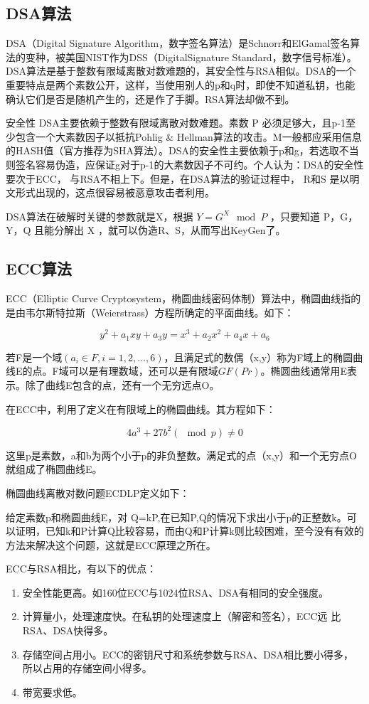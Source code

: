 \documentclass[UTF8,a4paper,10pt, twocolumn]{ctexart}
\begin{document}
\subsection{DSA算法}
DSA（Digital Signature Algorithm，数字签名算法）是Schnorr和ElGamal签名算法的变种，被美国NIST作为DSS（DigitalSignature Standard，数字信号标准）。DSA算法是基于整数有限域离散对数难题的，其安全性与RSA相似。DSA的一个重要特点是两个素数公开，这样，当使用别人的p和q时，即使不知道私钥，也能确认它们是否是随机产生的，还是作了手脚。RSA算法却做不到。

安全性 
DSA主要依赖于整数有限域离散对数难题。素数 P 必须足够大，且p-1至少包含一个大素数因子以抵抗Pohlig \& Hellman算法的攻击。M一般都应采用信息的HASH值（官方推荐为SHA算法）。DSA的安全性主要依赖于p和g，若选取不当则签名容易伪造，应保证g对于p-1的大素数因子不可约。个人认为：DSA的安全性要次于ECC， 与RSA不相上下。但是，在DSA算法的验证过程中， R和S 是以明文形式出现的，这点很容易被恶意攻击者利用。

DSA算法在破解时关键的参数就是X，根据 $Y = G^X \mod P$ ，只要知道 P，G，Y，Q 且能分解出 X ，就可以伪造R、S，从而写出KeyGen了。

\subsection{ECC算法}

ECC（Elliptic Curve Cryptosystem，椭圆曲线密码体制）算法中，椭圆曲线指的是由韦尔斯特拉斯（Weierstrass）方程所确定的平面曲线。如下：

$$ y^2 + a_1 xy + a_3 y = x^3 + a_2 x^2 + a_4 x + a_6 $$

若F是一个域$(a_i \in F,i=1,2,…,6)$，且满足式的数偶（x,y）称为F域上的椭圆曲线E的点。F域可以是有理数域，还可以是有限域$GF(Pr)$。椭圆曲线通常用E表示。除了曲线E包含的点，还有一个无穷远点O。

在ECC中，利用了定义在有限域上的椭圆曲线。其方程如下：

$$ 4a^3 + 27b^2(\mod p) \neq 0 $$

这里p是素数，a和b为两个小于p的非负整数。满足式的点（x,y）和一个无穷点O就组成了椭圆曲线E。

椭圆曲线离散对数问题ECDLP定义如下：

给定素数p和椭圆曲线E，对 Q=kP,在已知P,Q的情况下求出小于p的正整数k。可以证明，已知k和P计算Q比较容易，而由Q和P计算k则比较困难，至今没有有效的方法来解决这个问题，这就是ECC原理之所在。

ECC与RSA相比，有以下的优点：
\begin{enumerate}
\item 安全性能更高。如160位ECC与1024位RSA、DSA有相同的安全强度。
\item 计算量小，处理速度快。在私钥的处理速度上（解密和签名），ECC远 比RSA、DSA快得多。
\item 存储空间占用小。ECC的密钥尺寸和系统参数与RSA、DSA相比要小得多， 所以占用的存储空间小得多。
\item 带宽要求低。
\end{enumerate}
\end{document}
